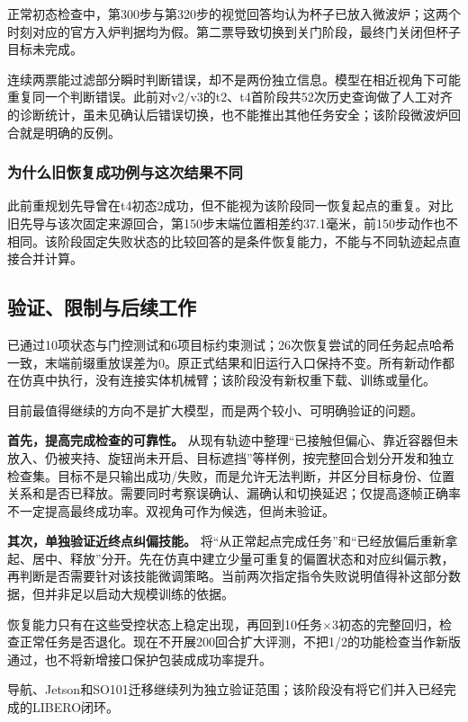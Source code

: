 正常初态检查中，第300步与第320步的视觉回答均认为杯子已放入微波炉；这两个时刻对应的官方入炉判据均为假。第二票导致切换到关门阶段，最终门关闭但杯子目标未完成。

连续两票能过滤部分瞬时判断错误，却不是两份独立信息。模型在相近视角下可能重复同一个判断错误。此前对v2/v3的t2、t4首阶段共52次历史查询做了人工对齐的诊断统计，虽未见确认后错误切换，也不能推出其他任务安全；该阶段微波炉回合就是明确的反例。

\subsubsection{为什么旧恢复成功例与这次结果不同}\label{s10-detail-12}

此前重规划先导曾在t4初态2成功，但不能视为该阶段同一恢复起点的重复。对比旧先导与该次固定来源回合，第150步末端位置相差约37.1毫米，前150步动作也不相同。该阶段固定失败状态的比较回答的是条件恢复能力，不能与不同轨迹起点直接合并计算。

\subsection{验证、限制与后续工作}\label{s10-detail-13}

已通过10项状态与门控测试和6项目标约束测试；26次恢复尝试的同任务起点哈希一致，末端前缀重放误差为0。原正式结果和旧运行入口保持不变。所有新动作都在仿真中执行，没有连接实体机械臂；该阶段没有新权重下载、训练或量化。

目前最值得继续的方向不是扩大模型，而是两个较小、可明确验证的问题。

\textbf{首先，提高完成检查的可靠性。} 从现有轨迹中整理``已接触但偏心、靠近容器但未放入、仍被夹持、旋钮尚未开启、目标遮挡''等样例，按完整回合划分开发和独立检查集。目标不是只输出成功/失败，而是允许无法判断，并区分目标身份、位置关系和是否已释放。需要同时考察误确认、漏确认和切换延迟；仅提高逐帧正确率不一定提高最终成功率。双视角可作为候选，但尚未验证。

\textbf{其次，单独验证近终点纠偏技能。} 将``从正常起点完成任务''和``已经放偏后重新拿起、居中、释放''分开。先在仿真中建立少量可重复的偏置状态和对应纠偏示教，再判断是否需要针对该技能微调策略。当前两次指定指令失败说明值得补这部分数据，但并非足以启动大规模训练的依据。

恢复能力只有在这些受控状态上稳定出现，再回到10任务\(\times\)3初态的完整回归，检查正常任务是否退化。现在不开展200回合扩大评测，不把1/2的功能检查当作新版通过，也不将新增接口保护包装成成功率提升。

导航、Jetson和SO101迁移继续列为独立验证范围；该阶段没有将它们并入已经完成的LIBERO闭环。



